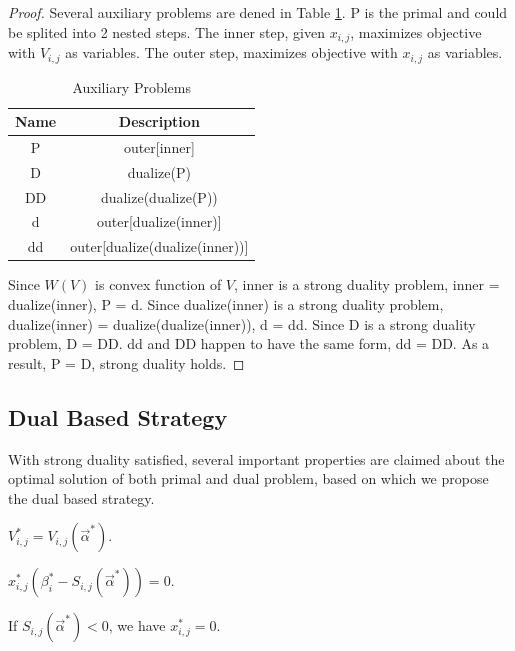 \documentclass[sigconf]{acmart}
\newcommand{\sx}{x_{i,j}}
\newcommand{\sV}{V_{i,j}}
\newcommand{\sbeta}{\beta_i}
\newcommand{\sS}{S_{i,j}}
\newcommand{\valpha}{\vec{\alpha}}
\begin{document}
\begin{proof}
Several auxiliary problems are dened in Table \ref{TableAuxiliaryProblems}.
P is the primal and could be splited into 2 nested steps.
The inner step, given $\sx$, maximizes objective with $\sV$ as variables.
The outer step, maximizes objective with $\sx$ as variables.

\begin{table}
\caption{Auxiliary Problems\label{TableAuxiliaryProblems}}
\begin{center}
\begin{tabular}{|c|c|}
\hline
Name   & Description \\
\hline
P      & outer[inner] \\
\hline
D      & dualize(P) \\
\hline
DD     & dualize(dualize(P)) \\
\hline
d      & outer[dualize(inner)] \\
\hline
dd     & outer[dualize(dualize(inner))] \\
\hline
\end{tabular}
\end{center}
\end{table}

Since $W(V)$ is convex function of $V$, inner is a strong duality problem, inner = dualize(inner), P = d.
Since dualize(inner) is a strong duality problem, dualize(inner) = dualize(dualize(inner)), d = dd.
Since D is a strong duality problem, D = DD.
dd and DD happen to have the same form, dd = DD.
As a result, P = D, strong duality holds.
\end{proof}

\subsection{Dual Based Strategy}

With strong duality satisfied, several important properties are claimed about the optimal solution of both primal and dual problem,
    based on which we propose the dual based strategy.

\begin{theorem}
$\sV^* = \sV(\valpha^*)$.
\end{theorem}

\begin{theorem}
$\sx^*(\sbeta^* - \sS(\valpha^*)) = 0$.
\end{theorem}

\begin{corollary}
If $\sS(\valpha^*) < 0$, we have $\sx^* = 0$.
\end{corollary}
\end{document}
